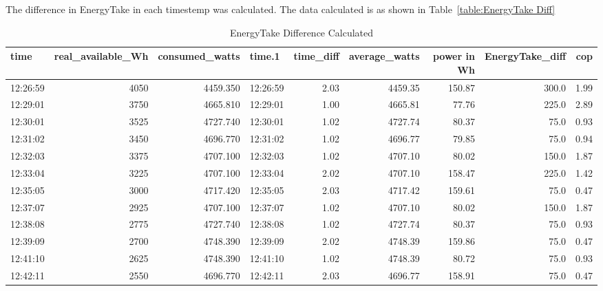 The difference in EnergyTake in each timestemp was calculated. The data calculated is as shown in Table~\ref{table:EnergyTake Diff}
\begin{table}[ht!]
\caption{EnergyTake Difference Calculated}
\begin{adjustbox}{max width=\textwidth}
\begin{tabular}{|l|r|r|l|r|r|r|r|r|}
\hline
    time &  real\_available\_Wh &  consumed\_watts &   time.1 &  time\_diff &  average\_watts &   power in Wh&  EnergyTake\_diff &  cop \\ \hline

12:26:59 &               4050 &        4459.350 & 12:26:59 &       2.03 &        4459.35 &  150.87 &            300.0 & 1.99 \\ \hline
12:29:01 &               3750 &        4665.810 & 12:29:01 &       1.00 &        4665.81 &   77.76 &            225.0 & 2.89 \\ \hline
12:30:01 &               3525 &        4727.740 & 12:30:01 &       1.02 &        4727.74 &   80.37 &             75.0 & 0.93 \\ \hline
12:31:02 &               3450 &        4696.770 & 12:31:02 &       1.02 &        4696.77 &   79.85 &             75.0 & 0.94 \\ \hline
12:32:03 &               3375 &        4707.100 & 12:32:03 &       1.02 &        4707.10 &   80.02 &            150.0 & 1.87 \\ \hline
12:33:04 &               3225 &        4707.100 & 12:33:04 &       2.02 &        4707.10 &  158.47 &            225.0 & 1.42 \\ \hline
12:35:05 &               3000 &        4717.420 & 12:35:05 &       2.03 &        4717.42 &  159.61 &             75.0 & 0.47 \\ \hline
12:37:07 &               2925 &        4707.100 & 12:37:07 &       1.02 &        4707.10 &   80.02 &            150.0 & 1.87 \\ \hline
12:38:08 &               2775 &        4727.740 & 12:38:08 &       1.02 &        4727.74 &   80.37 &             75.0 & 0.93 \\ \hline
12:39:09 &               2700 &        4748.390 & 12:39:09 &       2.02 &        4748.39 &  159.86 &             75.0 & 0.47 \\ \hline
12:41:10 &               2625 &        4748.390 & 12:41:10 &       1.02 &        4748.39 &   80.72 &             75.0 & 0.93 \\ \hline
12:42:11 &               2550 &        4696.770 & 12:42:11 &       2.03 &        4696.77 &  158.91 &             75.0 & 0.47 \\ \hline

\end{tabular}
\end{adjustbox}
\end{table}

